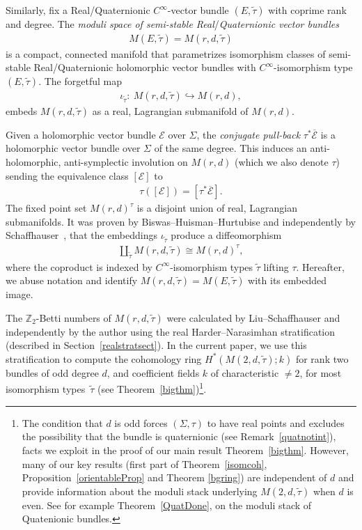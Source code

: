 \documentclass[10pt,a4paper]{amsart}
\numberwithin{equation}{section}
\begin{document}
{\sloppy Similarly, f\/ix a Real/Quaternionic $C^{\infty}$-vector bundle $(E,\tilde{\tau})$ with coprime rank and degree. The \emph{moduli space of semi-stable Real}/\emph{Quaternionic vector bundles} \begin{gather*}M(E,\tilde{\tau}) = M(r,d,\tilde{\tau})\end{gather*}
is a compact, connected manifold that parametrizes isomorphism classes of semi-stable Real/Qua\-ter\-nio\-nic holomorphic vector bundles with $C^{\infty}$-isomorphism type $(E,\tilde{\tau})$. The forgetful map
\begin{gather*}\iota_{\tilde{\tau}}\colon \ M(r,d,\tilde{\tau}) \hookrightarrow M(r,d),\end{gather*}
embeds $M(r,d,\tilde{\tau})$ as a real, Lagrangian submanifold of $M(r,d)$.

}

Given a holomorphic vector bundle ${\mathcal E}$ over $\Sigma$, the \emph{conjugate pull-back} $\tau^*\overline{{\mathcal E}}$ is a holomorphic vector bundle over $\Sigma$ of the same degree. This induces an anti-holomorphic, anti-symplectic involution on $M(r,d)$ (which we also denote $\tau$) sending the equivalence class $[{\mathcal E}]$ to \begin{gather*}\tau([{\mathcal E}]) = [\tau^*\overline{{\mathcal E}}].\end{gather*} The f\/ixed point set $M(r,d)^{\tau}$ is a disjoint union of real, Lagrangian submanifolds. It was proven by Biswas--Huisman--Hurtubise \cite{BHH} and independently by Schaf\/fhauser~\cite{S11, S12}, that the embeddings $\iota_{\tilde{\tau}}$ produce a dif\/feomorphism
\begin{gather*} \coprod_{\tilde{\tau}} M(r,d,\tilde{\tau}) \cong M(r,d)^{\tau},\end{gather*}
where the coproduct is indexed by $C^{\infty}$-isomorphism types $\tilde{\tau}$ lifting $\tau$. Hereafter, we abuse notation and identify $M(r,d,\tilde{\tau})= M(E,\tilde{\tau})$ with its embedded image.

The ${\mathbb Z}_2$-Betti numbers of $M(r,d,\tilde{\tau})$ were calculated by Liu--Schaf\/fhauser \cite{LS} and independently by the author \cite{B} using the real Harder--Narasimhan stratif\/ication (described in Section~\ref{realstratsect}). In the current paper, we use this stratif\/ication to compute the cohomology ring $H^*(M(2,d,\tilde{\tau}); k)$ for rank two bundles of odd degree $d$, and coef\/f\/icient f\/ields $k$ of characteristic $\neq 2$, for most isomorphism types~$\tilde{\tau}$ (see Theorem~\ref{bigthm})\footnote{The condition that $d$ is odd forces $(\Sigma, \tau)$ to have real points and excludes the possibility that the bundle is quaternionic (see Remark~\ref{quatnotint}), facts we exploit in the proof of our main result Theorem~\ref{bigthm}. However, many of our key results (f\/irst part of Theorem~\ref{isomcoh}, Proposition~\ref{orientableProp} and Theorem \ref{bgring}) are independent of $d$ and provide information about the moduli stack underlying $M(2,d,\tilde{\tau})$ when $d$ is even. See for example Theorem~\ref{QuatDone}, on the moduli stack of Quatenionic bundles.}.
\end{document}
